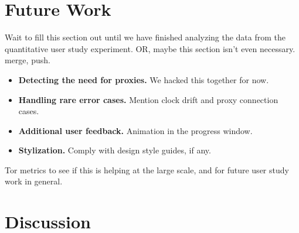\documentclass{template}
\begin{document}
\section{Future Work} 
{\color {red}
Wait to fill this section out until we have finished analyzing the data from the quantitative
user study experiment. OR, maybe this section isn't even necessary.\\

 merge, push. \\

\begin{itemize} \itemsep1pt \parskip0pt  
\item {\bfseries Detecting the need for proxies.} We hacked this together for now. 
\item {\bfseries Handling rare error cases.} Mention clock drift and proxy connection cases.
\item {\bfseries Additional user feedback.} Animation in the progress window. 
\item {\bfseries Stylization.} Comply with design style guides, if any. 
\end{itemize} 

 Tor metrics to see if this is helping at the large scale, and for future user study work in general. 
}

\section{Discussion} 
\end{document}
